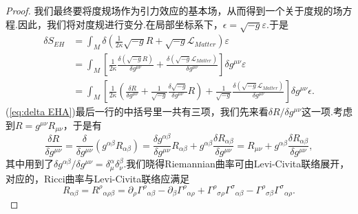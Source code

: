         \begin{proof}
            我们最终要将度规场作为引力效应的基本场，从而得到一个关于度规的场方程.因此，我们将对度规进行变分.在局部坐标系下，$\epsilon=\sqrt{-g}\varepsilon$.于是
            \begin{equation}
                \begin{split}\label{eq:delta EHA}
                    \delta S_{EH}&=\int_M\delta\left(\frac{1}{2\kappa}\sqrt{-g}R+\sqrt{-g}\mathcal{L} _{Matter}\right)\varepsilon\\
                    &=\int_M\left[\frac{1}{2\kappa}\frac{\delta\left(\sqrt{-g}R\right)}{\delta g^{\mu\nu}}+\frac{\delta\left(\sqrt{-g}\mathcal{L} _{Matter}\right)}{\delta g^{\mu\nu}}\right]\delta g^{\mu\nu}\varepsilon\\
                    &=\int_M\left[\frac{1}{2\kappa}\left(\frac{\delta R}{\delta g^{\mu\nu}}+\frac{1}{\sqrt{-g}}\frac{\delta\sqrt{-g}}{\delta g^{\mu\nu}}R\right)+\frac{1}{\sqrt{-g}}\frac{\delta\left(\sqrt{-g}\mathcal{L} _{Matter}\right)}{\delta g^{\mu\nu}}\right]\delta g^{\mu\nu}\epsilon.
                \end{split}
            \end{equation}
            (\ref{eq:delta EHA})最后一行的中括号里一共有三项，我们先来看$\delta R/\delta g^{\mu\nu}$这一项.考虑到$R=g^{\mu\nu}R_{\mu\nu}$，于是有
            $$\frac{\delta R}{\delta g^{\mu\nu}}=\frac{\delta }{\delta g^{\mu\nu}}\left(g^{\alpha\beta}{R}_{\alpha\beta}\right)=\frac{\delta g^{\alpha\beta}}{\delta g^{\mu\nu}}{R}_{\alpha\beta}+g^{\alpha\beta}\frac{\delta {R}_{\alpha\beta}}{\delta g^{\mu\nu}}={R}_{\mu\nu}+g^{\alpha\beta}\frac{\delta {R}_{\alpha\beta}}{\delta g^{\mu\nu}},$$
            其中用到了${\delta g^{\alpha\beta}}/{\delta g^{\mu\nu}}=\delta^\alpha_\mu\delta^\beta_\nu$.我们晓得Riemannian曲率可由Levi-Civita联络展开，对应的，Ricci曲率与Levi-Civita联络应满足
            $${R}_{\alpha\beta}={R^\rho}_{\alpha\rho\beta}=\partial_\rho{\varGamma^\rho}_{\alpha\beta}-\partial_\beta{\varGamma^\rho}_{\alpha\rho}+{\varGamma^\rho}_{\sigma\rho}{\varGamma^\sigma}_{\alpha\beta}-{\varGamma^\rho}_{\sigma\beta}{\varGamma^\sigma}_{\alpha\rho}.$$

\end{proof}
